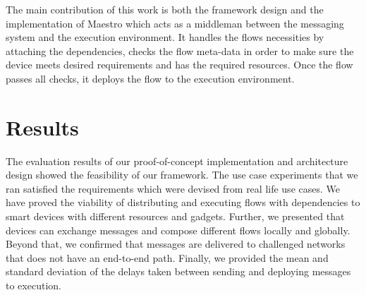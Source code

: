 \noindent The main contribution of this work is both the framework design and the implementation of Maestro which acts as a middleman between the messaging system and the execution environment. It handles the flows necessities by attaching the dependencies, checks the flow meta-data in order to make sure the device meets desired requirements and has the required resources. Once the flow passes all checks, it deploys the flow to the execution environment.


\section{Results}
The evaluation results of our  proof-of-concept implementation and architecture design showed the feasibility of our framework. The use case experiments that we ran satisfied the  requirements which were devised from  real life use cases. We have proved the viability of distributing and executing flows with dependencies to smart devices with different resources and gadgets. Further, we presented that devices can exchange messages and compose different flows locally and globally. Beyond that, we confirmed that messages are delivered to challenged networks that does not have an end-to-end path. Finally, we provided the mean and standard deviation of the delays taken between sending and deploying messages to execution. 



